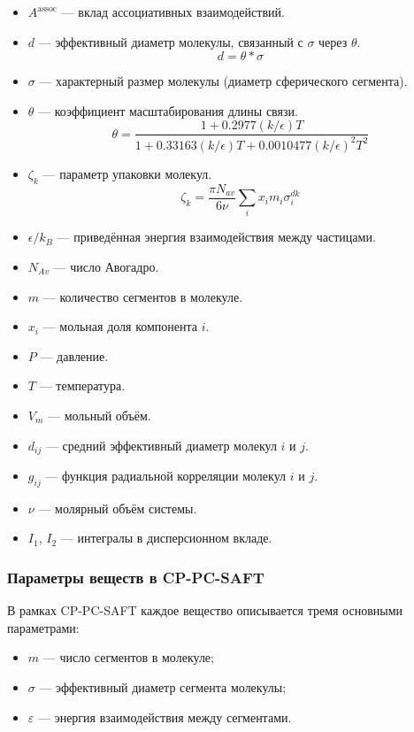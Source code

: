 \documentclass[a4paper,12pt]{article}
\begin{document}
\begin{itemize}
        \item \( A^{\text{assoc}} \) — вклад ассоциативных взаимодействий.
        \item $d$ — эффективный диаметр молекулы, связанный с $\sigma$ через $\theta$.
          \[
            d = \theta * \sigma
          \]
        \item $\sigma$ — характерный размер молекулы (диаметр сферического сегмента).
        \item $\theta$ — коэффициент масштабирования длины связи.
          \[
          \theta = \frac{1 + 0.2977 (k / \epsilon) T}{1 + 0.33163 (k / \epsilon) T + 0.0010477 (k / \epsilon)^2 T^2}
          \]
        \item $\zeta_k$ — параметр упаковки молекул.
          \[
          \zeta_k = \frac{\pi N_{av}}{6 \nu} \sum_i x_i m_i \sigma_i^{dk}
          \]
        \item $\epsilon / k_B$ — приведённая энергия взаимодействия между частицами.
        \item $N_{Av}$ — число Авогадро.
        \item $m$ — количество сегментов в молекуле.
        \item $x_i$ — мольная доля компонента $i$.
        \item $P$ — давление.
        \item $T$ — температура.
        \item $V_m$ — мольный объём.
        \item $d_{ij}$ — средний эффективный диаметр молекул $i$ и $j$.
        \item $g_{ij}$ — функция радиальной корреляции молекул $i$ и $j$.
        \item $\nu$ — молярный объём системы.
        \item $I_1$, $I_2$ — интегралы в дисперсионном вкладе.
    
    \end{itemize}
    
    \subsubsection{Параметры веществ  в CP-PC-SAFT}

В рамках CP-PC-SAFT каждое вещество описывается тремя основными параметрами:
\begin{itemize}
    \item \( m \) — число сегментов в молекуле;
    \item \( \sigma \) — эффективный диаметр сегмента молекулы;
    \item \( \varepsilon \) — энергия взаимодействия между сегментами.
\end{itemize}
\end{document}
